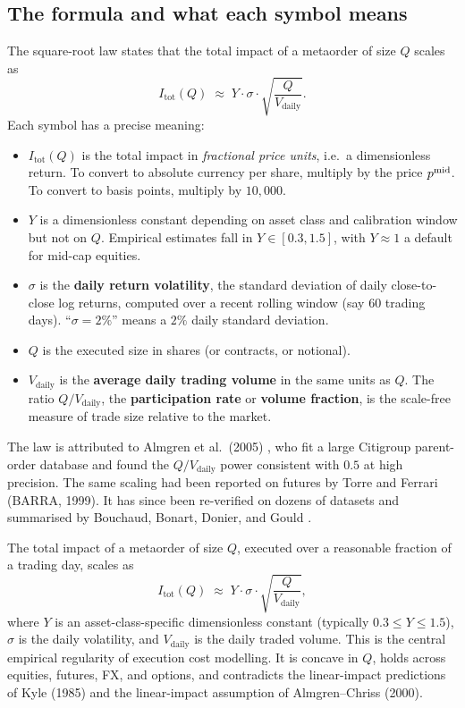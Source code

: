 \subsection{The formula and what each symbol means}
\label{subsec:sqrt_formula}

The square-root law states that the total impact of a metaorder of
size $Q$ scales as
\begin{equation}
  I_{\text{tot}}(Q) \;\approx\; Y \cdot \sigma \cdot \sqrt{\frac{Q}{V_{\text{daily}}}}.
  \label{eq:sqrt_law}
\end{equation}
Each symbol has a precise meaning:
\begin{itemize}
  \item $I_{\text{tot}}(Q)$ is the total impact in \emph{fractional
  price units}, i.e.\ a dimensionless return. To convert to
  absolute currency per share, multiply by the price $p^{\mathrm{mid}}$. To
  convert to basis points, multiply by $10{,}000$.
  \item $Y$ is a dimensionless constant depending on asset class
  and calibration window but not on $Q$. Empirical estimates fall
  in $Y \in [0.3, 1.5]$, with $Y \approx 1$ a default for mid-cap
  equities.
  \item $\sigma$ is the \textbf{daily return volatility}, the
  standard deviation of daily close-to-close log returns, computed
  over a recent rolling window (say $60$ trading days). ``$\sigma =
  2\%$'' means a $2\%$ daily standard deviation.
  \item $Q$ is the executed size in shares (or contracts, or notional).
  \item $V_{\text{daily}}$ is the \textbf{average daily trading
  volume} in the same units as $Q$. The ratio $Q / V_{\text{daily}}$,
  the \textbf{participation rate} or \textbf{volume fraction},
  is the scale-free measure of trade size relative to the market.
\end{itemize}

The law is attributed to Almgren et al.~(2005)
\citep{almgren2005direct}, who fit a large Citigroup parent-order
database and found the $Q / V_{\text{daily}}$ power consistent with
$0.5$ at high precision. The same scaling had been reported on
futures by Torre and Ferrari (BARRA, 1999). It has since been
re-verified on dozens of datasets and summarised by Bouchaud,
Bonart, Donier, and Gould \citeBouchaud.

\begin{keyfactbox}
The total impact of a metaorder of size $Q$, executed over a
reasonable fraction of a trading day, scales as
\[
  \boxed{\;I_{\text{tot}}(Q) \;\approx\; Y \cdot \sigma \cdot \sqrt{\frac{Q}{V_{\text{daily}}}},\;}
\]
where $Y$ is an asset-class-specific dimensionless constant (typically
$0.3 \le Y \le 1.5$), $\sigma$ is the daily volatility, and
$V_{\text{daily}}$ is the daily traded volume. This is the central
empirical regularity of execution cost modelling. It is concave in
$Q$, holds across equities, futures, FX, and options, and
contradicts the linear-impact predictions of Kyle (1985) and the
linear-impact assumption of Almgren--Chriss (2000).
\end{keyfactbox}

